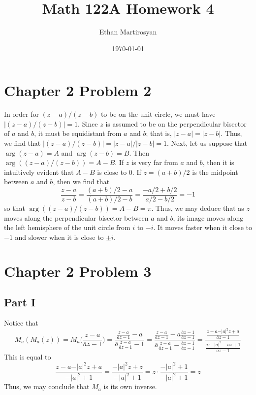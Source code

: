 \documentclass[12pt]{article}
\begin{document}
 
\title{Math 122A Homework 4}
\author{Ethan Martirosyan}
\date{\today}
\maketitle
{}
\hfuzz=50pt
\section*{Chapter 2 Problem 2}
In order for $(z-a)/(z-b)$ to be on the unit circle, we must have $\vert (z-a)/(z-b) \vert = 1$. Since $z$ is assumed to be on the perpendicular bisector of $a$ and $b$, it must be equidistant from $a$ and $b$; that is, $\vert z - a \vert = \vert z - b \vert$. Thus, we find that $\vert (z-a)/(z-b) \vert = \vert z - a \vert / \vert z - b \vert =  1$. Next, let us suppose that $\arg(z-a) = A$ and $\arg(z-b) = B$. Then $\arg((z-a)/(z-b)) = A - B$. If $z$ is very far from $a$ and $b$, then it is intuitively evident that $A-B$ is close to $0$. If $z = (a+b)/2$ is the midpoint between $a$ and $b$, then we find that
\[
\frac{z-a}{z-b} = \frac{(a+b)/2-a}{(a+b)/2-b} = \frac{-a/2 + b/2}{a/2-b/2} = -1  
\] so that $\arg((z-a)/(z-b)) = A - B = \pi$. Thus, we may deduce that as $z$ moves along the perpendicular bisector between $a$ and $b$, its image moves along the left hemisphere of the unit circle from $i$ to $-i$. It moves faster when it close to $-1$ and slower when it is close to $\pm i$.
\newpage
\section*{Chapter 2 Problem 3}
\subsection*{Part I}
Notice that
\[
M_a(M_a(z)) = M_a\bigg(\frac{z-a}{\overline{a}z - 1}\bigg) = \frac{\frac{z-a}{\overline{a}z-1} - a}{\overline{a}\frac{z-a}{\overline{a}z- 1} - 1} = \frac{\frac{z-a}{\overline{a}z-1} - a\frac{\overline{a}z-1}{\overline{a}z-1}}{\overline{a}\frac{z-a}{\overline{a}z- 1} - \frac{\overline{a}z-1}{\overline{a}z-1}} = \frac{\frac{z-a -\vert a \vert^2 z + a}{\overline{a}z - 1}}{\frac{\overline{a}z - \vert a \vert^2 - \overline{a}z + 1}{\overline{a}z - 1}}
\] This is equal to
\[
\frac{z - a -\vert a \vert^2 z + a}{-\vert a \vert^2 + 1} = \frac{-\vert a \vert^2 z + z}{-\vert a \vert^2 + 1} = z \cdot \frac{-\vert a \vert^2 + 1}{-\vert a \vert^2 + 1} = z
\] Thus, we may conclude that $M_a$ is its own inverse.
\end{document}
